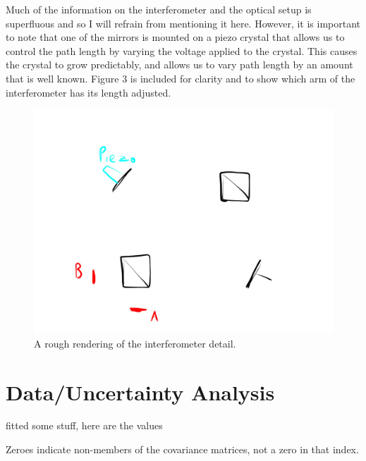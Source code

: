 \documentclass{article}
\begin{document}
Much of the information on the interferometer and the optical setup is superfluous and so I will refrain from mentioning it here.  However, it is important to note that one of the mirrors is mounted on a piezo crystal that allows us to control the path length by varying the voltage applied to the crystal.  This causes the crystal to grow predictably, and allows us to vary path length by an amount that is well known.  Figure 3 is included for clarity and to show which arm of the interferometer has its length adjusted.

\begin{figure}[!htb]
	\centering
	\includegraphics[scale=.3]{interferometer_sketch.jpg}
	\caption{A rough rendering of the interferometer detail.}
\end{figure}



\section{Data/Uncertainty Analysis}

fitted some stuff, here are the values

\begin{table}
	\centering
   		\caption{Zeroes indicate non-members of the covariance matrices, not a zero in that index.}
\end{table}
\end{document}
